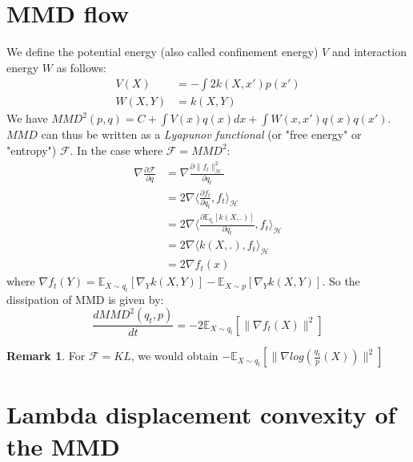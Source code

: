 \documentclass{article}
\newcommand{\1}{\mathbbm 1}
\newcommand{\E}{{{\mathbb E}}}
\newcommand{\kH}{{{\mathcal H}}}
\newcommand{\F}{{{\mathcal F}}}
\theoremstyle{definition}
\newtheorem{remark}{Remark}
\newtheorem{remark}[theorem]{Remark}
\begin{document}
\section{MMD flow}

We define the potential energy (also called confinement energy) $V$ and interaction energy $W$ as follows:
\begin{align}
    V(X)&=-\int 2 k(X,x')p(x')\\
    W(X,Y)&=k(X,Y)
\end{align}
We have $MMD^2(p,q)=C+ \int V(x) q(x)dx + \int W(x,x')q(x)q(x')$. $MMD$ can thus be written as a \textit{Lyapunov functional} (or "free energy" or "entropy") $\F$.
In the case where $\F=MMD^2$:
\begin{align}
        \nabla \frac{\partial \F}{\partial q}&= \nabla \frac{\partial \|f_t\|^2_{\kH}}{\partial q_t}\\
        &=2 \nabla \langle \frac{\partial f_t}{\partial q_t}, f_t \rangle_{\kH}\\
        &=2 \nabla \langle \frac{\partial \E_{q_t}[k(X,.)]}{\partial q_t}, f_t \rangle_{\kH}\\
        &=2 \nabla \langle k(X,.), f_t \rangle_{\kH}\\
        &= 2 \nabla f_t(x)
\end{align}
where $\nabla f_t(Y)= \E_{X \sim q_t}[\nabla_{Y}k(X,Y)] -  \E_{X \sim p}[\nabla_{Y}k(X,Y)]$. So the dissipation of MMD is given by:  
\begin{equation}
    \frac{d MMD^2(q_t, p)}{dt}=-2 \E_{X \sim q_t}[\|\nabla f_t(X)\|^2]
\end{equation}

\begin{remark}
For $\F=KL$, we would obtain $-\E_{X \sim q_t}[\|\nabla log(\frac{q_t}{p}(X))\|^2]$
\end{remark}



\section{Lambda displacement convexity of the MMD}
\end{document}
